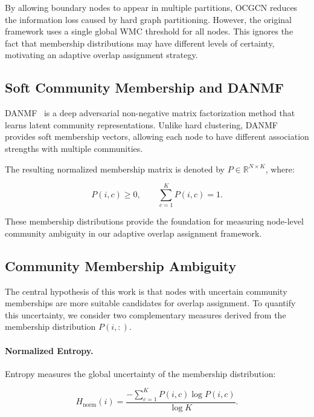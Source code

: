 \documentclass[a4paper,11pt,oneside,onecolumn,preprint]{elsarticle}
\numberwithin{equation}{section}
\begin{document}
By allowing boundary nodes to appear in multiple partitions, OCGCN reduces the information loss caused by hard graph partitioning.
However, the original framework uses a single global WMC threshold for all nodes.
This ignores the fact that membership distributions may have different levels of certainty, motivating an adaptive overlap assignment strategy.

\subsection{Soft Community Membership and DANMF}
\label{subsec:danmf}

DANMF~\cite{DANMF} is a deep adversarial non-negative matrix factorization method that learns latent community representations.
Unlike hard clustering, DANMF provides soft membership vectors, allowing each node to have different association strengths with multiple communities.

The resulting normalized membership matrix is denoted by
$P\in\mathbb{R}^{N\times K}$,
where:

\begin{equation}
P(i,c)\geq0,
\qquad
\sum_{c=1}^{K}P(i,c)=1.
\end{equation}

These membership distributions provide the foundation for measuring node-level community ambiguity in our adaptive overlap assignment framework.

\subsection{Community Membership Ambiguity}
\label{subsec:ambiguity}

The central hypothesis of this work is that nodes with uncertain community memberships are more suitable candidates for overlap assignment.
To quantify this uncertainty, we consider two complementary measures derived from the membership distribution $P(i,:)$.

\paragraph{Normalized Entropy.}

Entropy measures the global uncertainty of the membership distribution:

\begin{equation}
H_{\mathrm{norm}}(i)
=
\frac{
-\sum_{c=1}^{K}P(i,c)\log P(i,c)
}
{\log K}.
\label{eq:entropy}
\end{equation}
\end{document}
